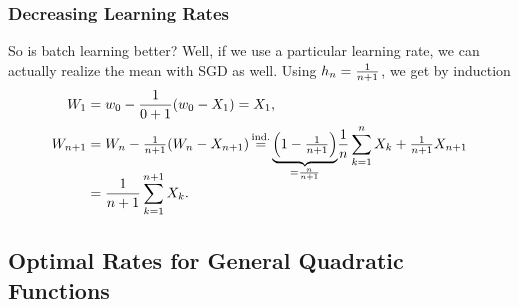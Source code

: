 \subsubsection{Decreasing Learning Rates}

So is batch learning better? Well, if we use a particular learning rate, we can
actually realize the mean with SGD as well. Using \(h_n=\frac1{n+1}\), we get
by induction
\begin{align}
	\label{eq: getting rid of w_0 first step}
	\Weights_1 &= \weights_0 - \frac{1}{0+1}(\weights_0 - X_1) = X_1,\\
	\label{eq: telescoping product}
	\Weights_{n+1}
	&= \Weights_n - \tfrac{1}{n+1}(\Weights_n - X_{n+1})
	\xeq{\text{ind.}}\smash{\underbrace{\left(1-\tfrac1{n+1}\right)}_{=\frac{n}{n+1}}}
	\frac1n\sum_{k=1}^n X_k + \tfrac{1}{n+1}X_{n+1}\\
	\nonumber
	&= \frac{1}{n+1}\sum_{k=1}^{n+1}X_k.
\end{align}

\subsection{Optimal Rates for General Quadratic Functions}

